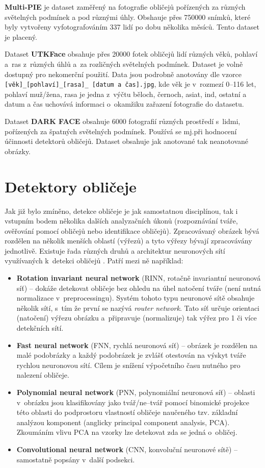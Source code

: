 \textbf{Multi-PIE} \cite{multipie} je dataset zaměřený na fotografie obličejů pořízených za různých světelných podmínek a pod různými úhly. Obshauje přes 750000 snímků, které byly vytvořeny vyfotografováním 337 lidí po dobu několika měsíců. Tento dataset je placený.

Dataset \textbf{UTKFace} \cite{utkface} obsahuje přes 20000 fotek obličejů lidí různých věků, pohlaví a~ras z~různých úhlů a~za rozličných světelných podmínek. Dataset je volně dostupný pro nekomerční použití. Data jsou podrobně anotovány dle vzorce \texttt{[věk]\_[pohlaví]\_[rasa]\_
[datum a čas].jpg}, kde věk je v~rozmezí 0--116 let, pohlaví muž/žena, rasa je jedna z~výčtu běloch, černoch, asiat, ind, ostatní a datum a čas uchovává informaci o~okamžiku zařazení fotografie do datasetu.

Dataset \textbf{DARK FACE} \cite{darkFace} obsahuje 6000 fotografií různých prostředí s~lidmi, pořízených za špatných světelných podmínek. Používá se mj.při hodnocení účinnosti detektorů obličejů. Dataset obsahuje jak anotované tak neanotované obrázky.

\section{Detektory obličeje}
\label{sekce:NSdetektory}

Jak již bylo zmíněno, detekce obličeje je jak samostatnou disciplínou, tak i vstupním bodem několika dalších analyzačních úkonů (rozpoznávání tváře, ověřování pomocí obličejů nebo identifikace obličejů). Zpracovávaný obrázek bývá rozdělen na několik menších oblastí (výřezů) a tyto výřezy bývají zpracovávány jednotlivě. 
Existuje řada různých druhů a architektur neuronových sítí využívaných k~detekci obličejů \cite{fdReviewNS}. Patří mezi ně například:

\begin{itemize}
  \item \textbf{Rotation invariant neural network} (RINN, rotačně invariantní neuronová síť) -- dokáže detekovat obličeje bez ohledu na úhel natočení tváře (není nutná normalizace v~preprocessingu). Systém tohoto typu neuronové sítě obsahuje několik sítí, s~tím že první se nazývá \emph{router network}. Tato síť určuje orientaci (natočení) výřezu obrázku a~připravuje (normalizuje) tak výřez pro 1 či více detekčních sítí.
  \item \textbf{Fast neural network} (FNN, rychlá neuronová síť) -- obrázek je rozdělen na malé podobrázky a každý podobrázek je zvlášť otestován na výskyt tváře rychlou neuronovou sítí. Cílem je snížení výpočetního času nutného pro nalezení obličeje.
  \item \textbf{Polynomial neural network} (PNN, polynomiální neuronová síť) -- oblasti v~obrázku jsou klasifikovány jako tvář/ne--tvář pomocí binomické projekce této oblasti do podprostoru vlastností obličeje naučeného tzv. základní analýzou komponent (anglicky principal component analysis, PCA). Zkoumáním vlivu PCA na vzorky lze detekovat zda se jedná o~obličej.
  \item \textbf{Convolutional neural network} (CNN, konvoluční neuronové sítě) -- samostatně popsány v~další podsekci. 
\end{itemize}


